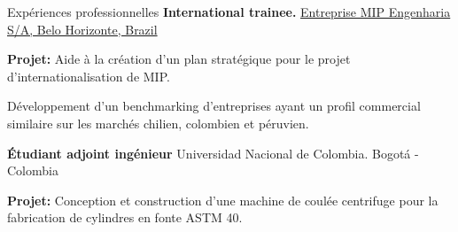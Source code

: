 \begin{rubric}{Expériences professionnelles}
\entry*[2010 -- 2011]%
	\textbf{International trainee.} \thinspace \href{http://www.mipengenharia.com.br/}{Entreprise MIP Engenharia S/A, Belo Horizonte, Brazil}
	
	\textbf{Projet:} Aide à la création d'un plan stratégique pour le projet d'internationalisation de MIP.
	
	Développement d'un benchmarking d'entreprises ayant un profil commercial similaire sur les marchés chilien, colombien et péruvien.


\entry*[2008 -- 2009]%
\textbf{Étudiant adjoint ingénieur}
Universidad Nacional de Colombia. Bogotá - Colombia	

\textbf{Projet:} Conception et construction d'une machine de coulée centrifuge pour la fabrication de cylindres en fonte ASTM 40.


\end{rubric}